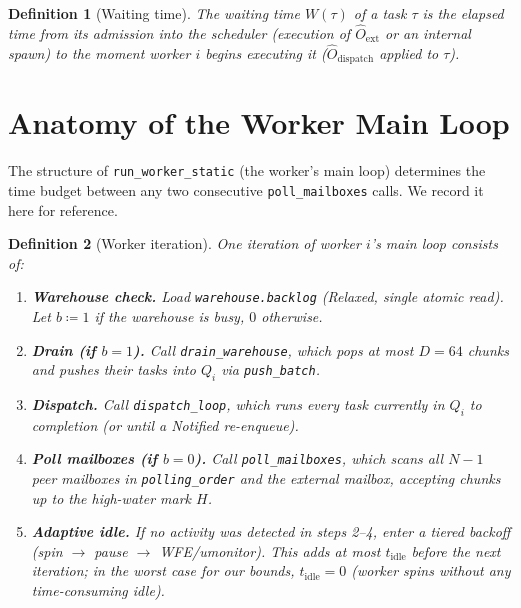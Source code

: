 \documentclass[11pt,a4paper]{article}
\newtheorem{definition}{Definition}[section]
\newcommand{\code}[1]{\texttt{#1}}
\begin{document}
\begin{definition}[Waiting time]
\label{def:wait}
The \emph{waiting time} $W(\tau)$ of a task $\tau$ is the elapsed
time from its admission into the scheduler (execution of
$\hat{O}_{\text{ext}}$ or an internal spawn) to the moment worker
$i$ begins executing it ($\hat{O}_{\text{dispatch}}$ applied to
$\tau$).
\end{definition}

\section{Anatomy of the Worker Main Loop}

The structure of \code{run\_worker\_static} (the worker's main loop)
determines the time budget between any two consecutive
\code{poll\_mailboxes} calls.  We record it here for reference.

\begin{definition}[Worker iteration]
\label{def:iteration}
One \emph{iteration} of worker $i$'s main loop consists of:
\begin{enumerate}
  \item \textbf{Warehouse check.}  Load \code{warehouse.backlog}
        (Relaxed, single atomic read).  Let $b \coloneqq 1$ if the
        warehouse is busy, $0$ otherwise.
  \item \textbf{Drain (if $b=1$).}  Call \code{drain\_warehouse},
        which pops at most $D = 64$ chunks and pushes their tasks
        into $Q_i$ via \code{push\_batch}.
  \item \textbf{Dispatch.}  Call \code{dispatch\_loop}, which runs
        every task currently in $Q_i$ to completion (or until a
        Notified re-enqueue).
  \item \textbf{Poll mailboxes (if $b=0$).}  Call
        \code{poll\_mailboxes}, which scans all $N-1$ peer mailboxes
        in \code{polling\_order} and the external mailbox, accepting
        chunks up to the high-water mark $H$.
  \item \textbf{Adaptive idle.}  If no activity was detected in
        steps 2--4, enter a tiered backoff (spin $\to$ pause $\to$
        WFE/umonitor).  This adds at most $t_{\text{idle}}$ before
        the next iteration; in the worst case for our bounds,
        $t_{\text{idle}} = 0$ (worker spins without any
        time-consuming idle).
\end{enumerate}
\end{definition}
\end{document}
